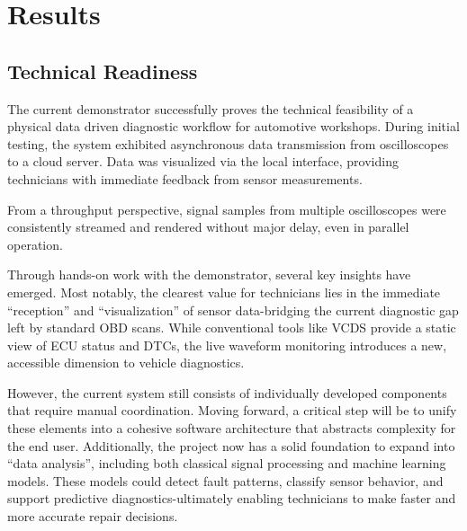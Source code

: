 \section{Results}
\subsection{Technical Readiness}
The current demonstrator successfully proves the technical feasibility of a physical data driven diagnostic workflow for automotive workshops. 
During initial testing, the system exhibited asynchronous data transmission from oscilloscopes to a cloud server.
Data was visualized via the local interface, providing technicians with immediate feedback from sensor measurements.

From a throughput perspective, signal samples from multiple oscilloscopes were consistently streamed and rendered without major delay, even in parallel operation. 

Through hands-on work with the demonstrator, several key insights have emerged. 
Most notably, the clearest value for technicians lies in the immediate ``reception'' and ``visualization'' of sensor data-bridging the current diagnostic gap left by standard OBD scans. 
While conventional tools like VCDS provide a static view of ECU status and DTCs, the live waveform monitoring introduces a new, accessible dimension to vehicle diagnostics.

However, the current system still consists of individually developed components that require manual coordination. 
Moving forward, a critical step will be to unify these elements into a cohesive software architecture that abstracts complexity for the end user. 
Additionally, the project now has a solid foundation to expand into ``data analysis'', including both classical signal processing and machine learning models. 
These models could detect fault patterns, classify sensor behavior, and support predictive diagnostics-ultimately enabling technicians to make faster and more accurate repair decisions.



